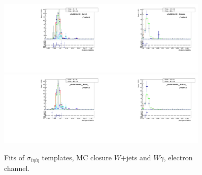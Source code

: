\begin{figure}[htb]
\begin{center}
   \includegraphics[width=0.45\textwidth]{../figs/figs_v11/ELECTRON_WGamma/MCclosureWjetsPlusWg/c_TEMPL_SIHIH_UNblind__phoEt95to120__Barrel__RooFit_MCclosure.pdf}\includegraphics[width=0.45\textwidth]{../figs/figs_v11/ELECTRON_WGamma/MCclosureWjetsPlusWg/c_TEMPL_SIHIH_UNblind__phoEt95to120__Endcap__RooFit_MCclosure.pdf}\\
   \includegraphics[width=0.45\textwidth]{../figs/figs_v11/ELECTRON_WGamma/MCclosureWjetsPlusWg/c_TEMPL_SIHIH_UNblind__phoEt120to500__Barrel__RooFit_MCclosure.pdf}\includegraphics[width=0.45\textwidth]{../figs/figs_v11/ELECTRON_WGamma/MCclosureWjetsPlusWg/c_TEMPL_SIHIH_UNblind__phoEt120to500__Endcap__RooFit_MCclosure.pdf}\\
  \label{fig:templateFits_MCclosureWjetsPlusWg_SIHIH_ELECTRON_3}
  \caption{Fits of $\sigma_{i \eta i \eta}$ templates, MC closure $W$+jets and $W\gamma$, electron channel.}
  \end{center}
\end{figure}
